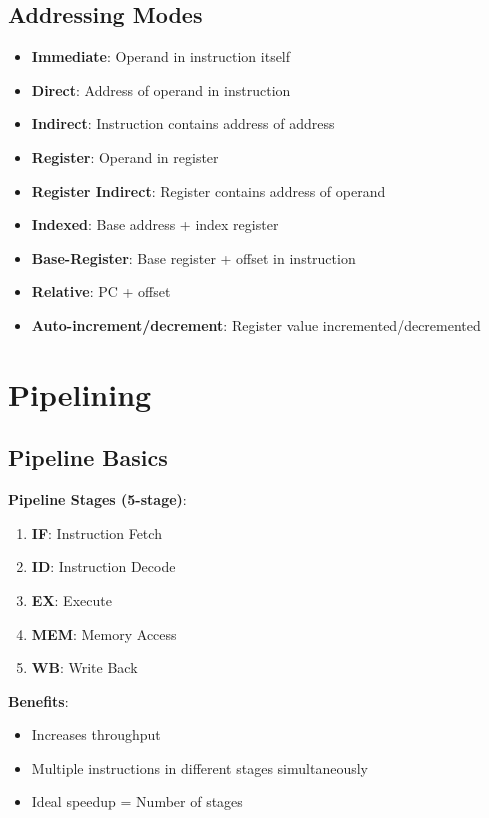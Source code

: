 \documentclass[12pt,a4paper]{report}
\begin{document}
\subsection{Addressing Modes}
\begin{concept}
\begin{itemize}
    \item \textbf{Immediate}: Operand in instruction itself
    \item \textbf{Direct}: Address of operand in instruction
    \item \textbf{Indirect}: Instruction contains address of address
    \item \textbf{Register}: Operand in register
    \item \textbf{Register Indirect}: Register contains address of operand
    \item \textbf{Indexed}: Base address + index register
    \item \textbf{Base-Register}: Base register + offset in instruction
    \item \textbf{Relative}: PC + offset
    \item \textbf{Auto-increment/decrement}: Register value incremented/decremented
\end{itemize}
\end{concept}

\section{Pipelining}

\subsection{Pipeline Basics}
\begin{concept}
\textbf{Pipeline Stages (5-stage)}:
\begin{enumerate}
    \item \textbf{IF}: Instruction Fetch
    \item \textbf{ID}: Instruction Decode
    \item \textbf{EX}: Execute
    \item \textbf{MEM}: Memory Access
    \item \textbf{WB}: Write Back
\end{enumerate}

\textbf{Benefits}:
\begin{itemize}
    \item Increases throughput
    \item Multiple instructions in different stages simultaneously
    \item Ideal speedup = Number of stages
\end{itemize}
\end{concept}
\end{document}
